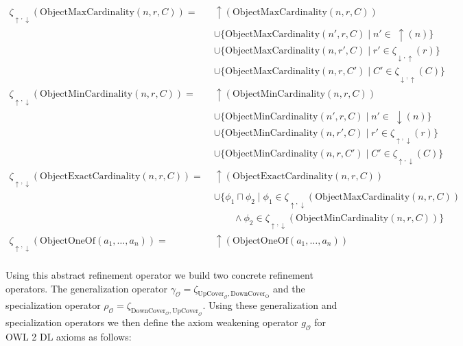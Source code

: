 \begin{align*}
    \zeta_{\uparrow, \downarrow}(\mathrm{ObjectMaxCardinality}(n, r, C)) = \;& \uparrow (\mathrm{ObjectMaxCardinality}(n, r, C)) \\&  \cup \{\mathrm{ObjectMaxCardinality}(n', r, C) \mid n' \in \; \uparrow (n)\} \\&   \cup \{\mathrm{ObjectMaxCardinality}(n, r', C) \mid r' \in \zeta_{\downarrow, \uparrow}(r)\} \\&  \cup \{\mathrm{ObjectMaxCardinality}(n, r, C') \mid C' \in \zeta_{\downarrow, \uparrow} (C)\} \\
    \zeta_{\uparrow, \downarrow}(\mathrm{ObjectMinCardinality}(n, r, C)) = \;& \uparrow (\mathrm{ObjectMinCardinality}(n, r, C)) \\& \cup \{\mathrm{ObjectMinCardinality}(n', r, C) \mid n' \in \; \downarrow (n)\} \\& \cup \{\mathrm{ObjectMinCardinality}(n, r', C) \mid r' \in \zeta_{\uparrow, \downarrow}(r)\} \\& \cup \{\mathrm{ObjectMinCardinality}(n, r, C') \mid C' \in \zeta_{\uparrow, \downarrow} (C)\} \\
    \zeta_{\uparrow, \downarrow}(\mathrm{ObjectExactCardinality}(n, r, C)) = \;& \uparrow (\mathrm{ObjectExactCardinality}(n, r, C)) \\& \cup \{ \phi_1 \sqcap \phi_2   \mid \phi_1 \in \zeta_{\uparrow, \downarrow} (\mathrm{ObjectMaxCardinality}(n, r, C)) \\ \;& \qquad \land \phi_2 \in \zeta_{\uparrow, \downarrow} (\mathrm{ObjectMinCardinality}(n, r, C)) \} \\
    \zeta_{\uparrow, \downarrow}(\mathrm{ObjectOneOf}(a_1, \dots, a_n)) = \;& \uparrow (\mathrm{ObjectOneOf}(a_1, \dots, a_n)) \\
\end{align*}
\endgroup

Using this abstract refinement operator we build two concrete refinement operators. The generalization operator $\gamma_\mathcal{O} = \zeta_{\mathrm{UpCover}_\mathcal{O}, \mathrm{DownCover}_\mathrm{O}}$ and the specialization operator $\rho_\mathcal{O} = \zeta_{\mathrm{DownCover}_\mathcal{O}, \mathrm{UpCover}_\mathcal{O}}$. Using these generalization and specialization operators we then define the axiom weakening operator $g_\mathcal{O}$ for OWL 2 DL axioms as follows:

